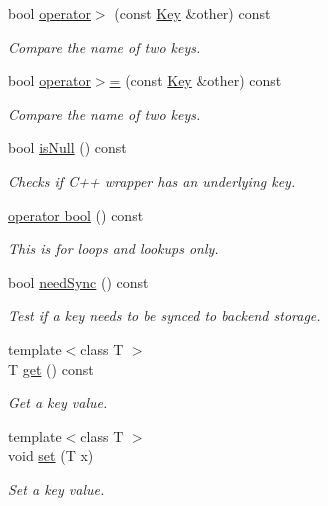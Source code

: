 \begin{DoxyCompactItemize}
bool \hyperlink{classkdb_1_1Key_a1bd2b165eeade6a71401b9b122864bad}{operator$>$} (const \hyperlink{classkdb_1_1Key}{Key} \&other) const 
\begin{DoxyCompactList}\small\item\em Compare the name of two keys. \end{DoxyCompactList}\item 
bool \hyperlink{classkdb_1_1Key_aa1258657e3dbddf4aed3716dd63d2a3c}{operator$>$=} (const \hyperlink{classkdb_1_1Key}{Key} \&other) const 
\begin{DoxyCompactList}\small\item\em Compare the name of two keys. \end{DoxyCompactList}\item 
bool \hyperlink{classkdb_1_1Key_a46ac7f1f28842e6edc03b2f97ae14bdc}{is\+Null} () const 
\begin{DoxyCompactList}\small\item\em Checks if C++ wrapper has an underlying key. \end{DoxyCompactList}\item 
\hyperlink{classkdb_1_1Key_ac203d41896988df49dd149c2a6ad91d8}{operator bool} () const 
\begin{DoxyCompactList}\small\item\em This is for loops and lookups only. \end{DoxyCompactList}\item 
bool \hyperlink{classkdb_1_1Key_ab727b6254fec01a129d3e6ac681a5fe5}{need\+Sync} () const 
\begin{DoxyCompactList}\small\item\em Test if a key needs to be synced to backend storage. \end{DoxyCompactList}\item 
{\footnotesize template$<$class T $>$ }\\T \hyperlink{classkdb_1_1Key_a0916e2e6be60b5c591bae56e250ed693}{get} () const 
\begin{DoxyCompactList}\small\item\em Get a key value. \end{DoxyCompactList}\item 
{\footnotesize template$<$class T $>$ }\\void \hyperlink{classkdb_1_1Key_a615124f0a2b291e03975b49c233654d7}{set} (T x)
\begin{DoxyCompactList}\small\item\em Set a key value. \end{DoxyCompactList}\item 

\end{DoxyCompactItemize}
